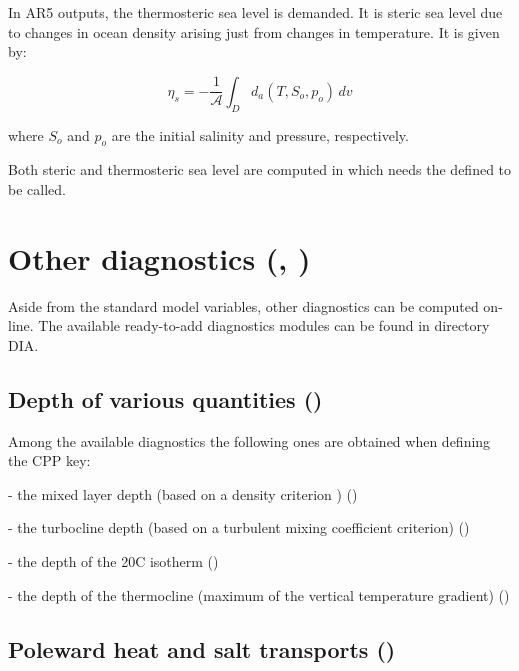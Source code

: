 \documentclass[../tex_main/NEMO_manual]{subfiles}
\begin{document}
In AR5 outputs, the thermosteric sea level is demanded.
It is steric sea level due to changes in ocean density arising just from changes in temperature.
It is given by:

\[	\eta_s = - \frac{1}{\mathcal{A}} \int_D d_a(T,S_o,p_o) \,dv
 \label{eq:thermosteric_Bq} \]

where $S_o$ and $p_o$ are the initial salinity and pressure, respectively.

Both steric and thermosteric sea level are computed in  which needs the  defined to
be called.

\section{Other diagnostics (\protect{}, \protect{})}
\label{sec:DIA_diag_others}

Aside from the standard model variables, other diagnostics can be computed on-line.
The available ready-to-add diagnostics modules can be found in directory DIA.

\subsection{Depth of various quantities (\protect{})}

Among the available diagnostics the following ones are obtained when defining the  CPP key:

- the mixed layer depth (based on a density criterion \citep{de_Boyer_Montegut_al_JGR04}) ()

- the turbocline depth (based on a turbulent mixing coefficient criterion) ()

- the depth of the 20\deg C isotherm ()

- the depth of the thermocline (maximum of the vertical temperature gradient) ()


\subsection{Poleward heat and salt transports (\protect{})}
\end{document}
